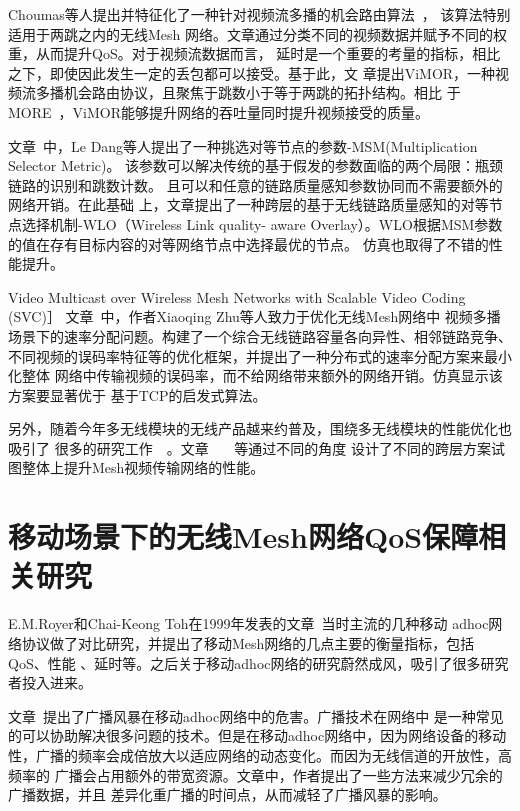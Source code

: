 Choumas等人提出并特征化了一种针对视频流多播的机会路由算法~\cite{vimor}，
该算法特别适用于两跳之内的无线Mesh
网络。文章通过分类不同的视频数据并赋予不同的权重，从而提升QoS。对于视频流数据而言，
延时是一个重要的考量的指标，相比之下，即使因此发生一定的丢包都可以接受。基于此，文
章提出ViMOR，一种视频流多播机会路由协议，且聚焦于跳数小于等于两跳的拓扑结构。相比
于MORE~\cite{MORE}，ViMOR能够提升网络的吞吐量同时提升视频接受的质量。

文章~\cite{MSM-WLO}中，Le Dang等人提出了一种挑选对等节点的参数-MSM(Multiplication 
Selector Metric)。
该参数可以解决传统的基于假发的参数面临的两个局限：瓶颈链路的识别和跳数计数。
且可以和任意的链路质量感知参数协同而不需要额外的网络开销。在此基础
上，文章提出了一种跨层的基于无线链路质量感知的对等节点选择机制-WLO（Wireless Link quality-
aware Overlay）。WLO根据MSM参数的值在存有目标内容的对等网络节点中选择最优的节点。
仿真也取得了不错的性能提升。

Video Multicast over Wireless Mesh Networks with Scalable Video Coding (SVC)］
文章~\cite{rateallocation}中，作者Xiaoqing Zhu等人致力于优化无线Mesh网络中
视频多播场景下的速率分配问题。构建了一个综合无线链路容量各向异性、相邻链路竞争、
不同视频的误码率特征等的优化框架，并提出了一种分布式的速率分配方案来最小化整体
网络中传输视频的误码率，而不给网络带来额外的网络开销。仿真显示该方案要显著优于
基于TCP的启发式算法。

另外，随着今年多无线模块的无线产品越来约普及，围绕多无线模块的性能优化也吸引了
很多的研究工作~\cite{ABI}~\cite{crosslayermultiradio}。文章~\cite{crosslayervideostream}
~\cite{crosslayeroptimization}~\cite{crosslayervideotransmission}等通过不同的角度
设计了不同的跨层方案试图整体上提升Mesh视频传输网络的性能。

\section{移动场景下的无线Mesh网络QoS保障相关研究}
E.M.Royer和Chai-Keong Toh在1999年发表的文章~\cite{review}当时主流的几种移动
adhoc网络协议做了对比研究，并提出了移动Mesh网络的几点主要的衡量指标，包括QoS、性能
、延时等。之后关于移动adhoc网络的研究蔚然成风，吸引了很多研究者投入进来。

文章~\cite{broadcaststorm}提出了广播风暴在移动adhoc网络中的危害。广播技术在网络中
是一种常见的可以协助解决很多问题的技术。但是在移动adhoc网络中，因为网络设备的移动
性，广播的频率会成倍放大以适应网络的动态变化。而因为无线信道的开放性，高频率的
广播会占用额外的带宽资源。文章中，作者提出了一些方法来减少冗余的广播数据，并且
差异化重广播的时间点，从而减轻了广播风暴的影响。

